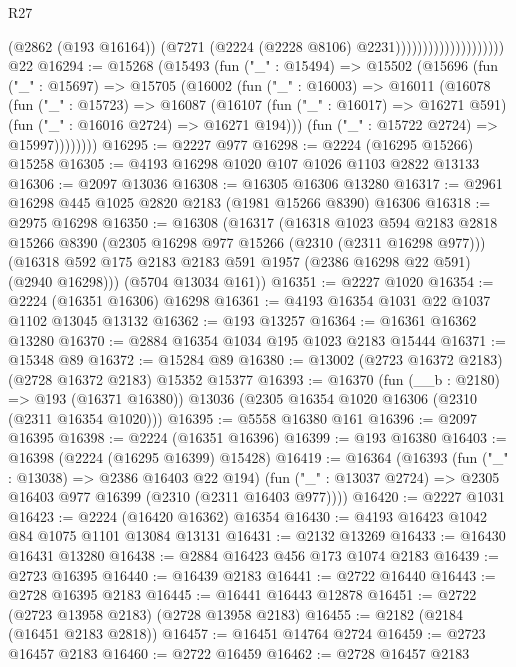 \begin{lexlean}{R27}
\begin{coremodule}
                                        (@2862 (@193 @16164))
                                        (@7271 (@2224 (@2228 @8106) @2231))))))))))))))))))))
    @22
@16294 := @15268
    (@15493
      (fun ("_" : @15494) =>
      @15502
        (@15696
          (fun ("_" : @15697) =>
          @15705
            (@16002
              (fun ("_" : @16003) =>
              @16011
                (@16078
                  (fun ("_" : @15723) =>
                  @16087
                    (@16107
                      (fun ("_" : @16017) => @16271 @591)
                      (fun ("_" : @16016 @2724) => @16271 @194)))
                  (fun ("_" : @15722 @2724) => @15997))))))))
@16295 := @2227 @977
@16298 := @2224 (@16295 @15266) @15258
@16305 := @4193 @16298 @1020 @107 @1026 @1103 @2822 @13133
@16306 := @2097 @13036
@16308 := @16305 @16306 @13280
@16317 := @2961 @16298 @445 @1025 @2820 @2183 (@1981 @15266 @8390) @16306
@16318 := @2975 @16298
@16350 := @16308
    (@16317
      (@16318
        @1023
        @594
        @2183
        @2818
        @15266
        @8390
        (@2305 @16298 @977 @15266 (@2310 (@2311 @16298 @977)))
        (@16318 @592 @175 @2183 @2183 @591 @1957 (@2386 @16298 @22 @591) (@2940 @16298)))
      (@5704 @13034 @161))
@16351 := @2227 @1020
@16354 := @2224 (@16351 @16306) @16298
@16361 := @4193 @16354 @1031 @22 @1037 @1102 @13045 @13132
@16362 := @193 @13257
@16364 := @16361 @16362 @13280
@16370 := @2884 @16354 @1034 @195 @1023 @2183 @15444
@16371 := @15348 @89
@16372 := @15284 @89
@16380 := @13002 (@2723 @16372 @2183) (@2728 @16372 @2183) @15352 @15377
@16393 := @16370
    (fun (__b : @2180) => @193 (@16371 @16380))
    @13036
    (@2305 @16354 @1020 @16306 (@2310 (@2311 @16354 @1020)))
@16395 := @5558 @16380 @161
@16396 := @2097 @16395
@16398 := @2224 (@16351 @16396)
@16399 := @193 @16380
@16403 := @16398 (@2224 (@16295 @16399) @15428)
@16419 := @16364
    (@16393
      (fun ("_" : @13038) => @2386 @16403 @22 @194)
      (fun ("_" : @13037 @2724) => @2305 @16403 @977 @16399 (@2310 (@2311 @16403 @977))))
@16420 := @2227 @1031
@16423 := @2224 (@16420 @16362) @16354
@16430 := @4193 @16423 @1042 @84 @1075 @1101 @13084 @13131
@16431 := @2132 @13269
@16433 := @16430 @16431 @13280
@16438 := @2884 @16423 @456 @173 @1074 @2183
@16439 := @2723 @16395
@16440 := @16439 @2183
@16441 := @2722 @16440
@16443 := @2728 @16395 @2183
@16445 := @16441 @16443 @12878
@16451 := @2722 (@2723 @13958 @2183) (@2728 @13958 @2183)
@16455 := @2182 (@2184 (@16451 @2183 @2818))
@16457 := @16451 @14764 @2724
@16459 := @2723 @16457 @2183
@16460 := @2722 @16459
@16462 := @2728 @16457 @2183

\end{coremodule}
\end{lexlean}
